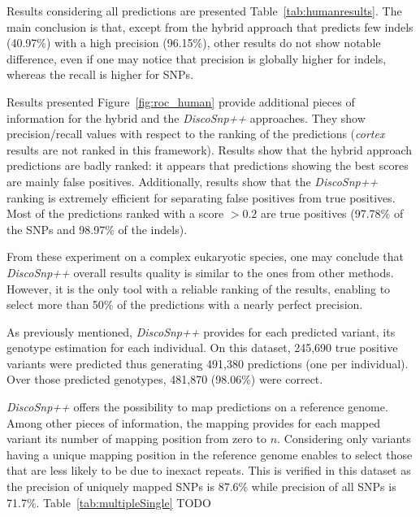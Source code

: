 \documentclass{bmcart}
\newcommand{\discopp}{{\it DiscoSnp++}\xspace}
\newcommand{\co}{{\it cortex}\xspace}
\begin{document}
Results 
considering all predictions are presented Table~\ref{tab:humanresults}. 
The main conclusion is that, except from the hybrid approach that predicts few indels (40.97\%) with a high precision (96.15\%), other results do not show  notable difference, even if one may notice that precision is globally higher for indels, whereas the recall is higher for SNPs. 

Results presented Figure~\ref{fig:roc_human} provide additional pieces of information for the hybrid and the \discopp approaches. They show precision/recall values with respect to the ranking of the predictions (\co results are not ranked in this framework). Results show that the hybrid approach predictions are badly ranked: it appears that predictions showing the best scores are mainly false positives. Additionally, results show that the \discopp ranking is extremely efficient for separating false positives from true positives. Most of the predictions ranked with a score $>0.2$ are true positives (97.78\%  of the SNPs and 98.97\% of the indels). 

From these experiment on a complex eukaryotic species, one may conclude that \discopp overall results quality is similar to the ones from other methods. However, it is the only tool with a reliable ranking of the results, enabling to select more than 50\% of the predictions with a nearly perfect precision.

As previously mentioned, \discopp provides for each predicted variant, its genotype estimation for each individual. On this dataset, 245,690 true positive variants were predicted thus generating 491,380 predictions (one per individual). Over those predicted genotypes, 481,870 (98.06\%) were correct. 

\discopp offers the possibility to map predictions on a reference genome. Among other pieces of information, the mapping provides for each mapped variant its number of mapping position from zero to $n$. Considering only variants having a unique mapping position in the reference genome enables to select those that are less likely to be due to inexact repeats. This is verified in this dataset as the precision of uniquely mapped SNPs is 87.6\% while precision of all SNPs is 71.7\%.
Table~\ref{tab:multipleSingle} TODO
\end{document}
